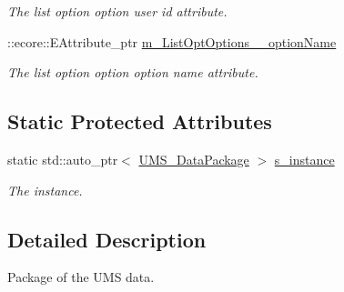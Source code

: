 \begin{DoxyCompactItemize}
\begin{DoxyCompactList}\small\item\em The list option option user id attribute. \item\end{DoxyCompactList}\item 
\hypertarget{classUMS__Data_1_1UMS__DataPackage_a362114a831aeeb8ae47beecb5aede650}{
::ecore::EAttribute\_\-ptr \hyperlink{classUMS__Data_1_1UMS__DataPackage_a362114a831aeeb8ae47beecb5aede650}{m\_\-ListOptOptions\_\-\_\-optionName}}
\label{classUMS__Data_1_1UMS__DataPackage_a362114a831aeeb8ae47beecb5aede650}

\begin{DoxyCompactList}\small\item\em The list option option option name attribute. \item\end{DoxyCompactList}\end{DoxyCompactItemize}
\subsection*{Static Protected Attributes}
\begin{DoxyCompactItemize}
\item 
\hypertarget{classUMS__Data_1_1UMS__DataPackage_a50cfd046e3e69d54a73c8bae2dce8959}{
static std::auto\_\-ptr$<$ \hyperlink{classUMS__Data_1_1UMS__DataPackage}{UMS\_\-DataPackage} $>$ \hyperlink{classUMS__Data_1_1UMS__DataPackage_a50cfd046e3e69d54a73c8bae2dce8959}{s\_\-instance}}
\label{classUMS__Data_1_1UMS__DataPackage_a50cfd046e3e69d54a73c8bae2dce8959}

\begin{DoxyCompactList}\small\item\em The instance. \item\end{DoxyCompactList}\end{DoxyCompactItemize}


\subsection{Detailed Description}
Package of the UMS data. 

